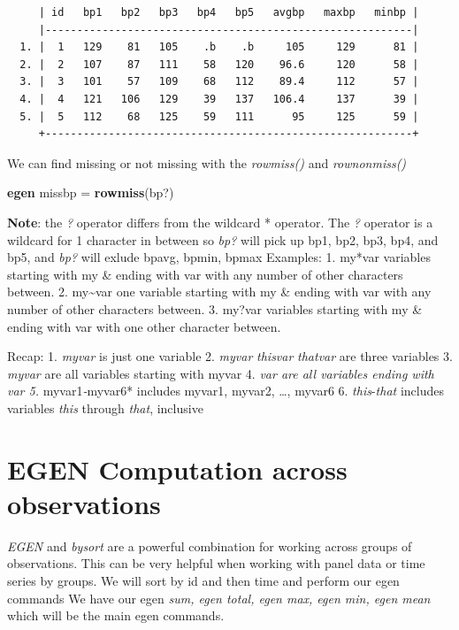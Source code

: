 \documentclass[
]{book}
\newenvironment{Shaded}{\begin{snugshade}}{\end{snugshade}}
\newcommand{\FunctionTok}[1]{\textcolor[rgb]{0.13,0.29,0.53}{\textbf{#1}}}
\newcommand{\KeywordTok}[1]{\textcolor[rgb]{0.13,0.29,0.53}{\textbf{#1}}}
\newcommand{\NormalTok}[1]{#1}
\begin{document}
\begin{verbatim}
     | id   bp1   bp2   bp3   bp4   bp5   avgbp   maxbp   minbp |
     |----------------------------------------------------------|
  1. |  1   129    81   105    .b    .b     105     129      81 |
  2. |  2   107    87   111    58   120    96.6     120      58 |
  3. |  3   101    57   109    68   112    89.4     112      57 |
  4. |  4   121   106   129    39   137   106.4     137      39 |
  5. |  5   112    68   125    59   111      95     125      59 |
     +----------------------------------------------------------+
\end{verbatim}

We can find missing or not missing with the \emph{rowmiss()} and \emph{rownonmiss()}

\begin{Shaded}
\begin{Highlighting}[]
    \KeywordTok{egen}\NormalTok{ missbp = }\FunctionTok{rowmiss}\NormalTok{(bp?)}
\end{Highlighting}
\end{Shaded}

\textbf{Note}: the \emph{?} operator differs from the wildcard * operator. The \emph{?} operator is a wildcard for 1 character in between so \emph{bp?} will pick up bp1, bp2, bp3, bp4, and bp5, and \emph{bp?} will exlude bpavg, bpmin, bpmax
Examples:
1. my*var variables starting with my \& ending with var with any number of other characters between.
2. my\textasciitilde var one variable starting with my \& ending with var with any number of other characters between.
3. my?var variables starting with my \& ending with var with one other character between.

Recap:
1. \emph{myvar} is just one variable
2. \emph{myvar} \emph{thisvar} \emph{thatvar} are three variables
3. \emph{myvar} are all variables starting with myvar
4. \emph{var are all variables ending with var
5. }myvar1\emph{-}myvar6* includes myvar1, myvar2, \ldots, myvar6
6. \emph{this}-\emph{that} includes variables \emph{this} through \emph{that}, inclusive

\section{EGEN Computation across observations}\label{egen-computation-across-observations}

\emph{EGEN} and \emph{bysort} are a powerful combination for working across groups
of observations. This can be very helpful when working with panel
data or time series by groups. We will sort by id and then time and
perform our egen commands
We have our egen \emph{sum, egen total, egen max, egen min, egen mean} which will be the main egen commands.
\end{document}
